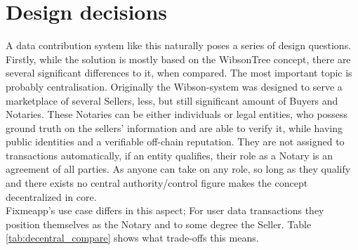\documentclass[a4paper,11pt]{report} %
\theoremstyle{change}
\theoremstyle{theoremstyle}
\begin{document}
\section{Design decisions}
A data contribution system like this naturally poses a series of design questions. Firstly, while the solution is mostly based on the WibsonTree concept, there are several significant differences to it, when compared. The most important topic is probably centralisation. Originally the Wibson-system was designed to serve a marketplace of several Sellers, less, but still significant amount of Buyers and Notaries. These Notaries can be either individuals or legal entities, who possess ground truth on the sellers' information and are able to verify it, while having public identities and a verifiable off-chain reputation. \cite{travizano2020wibson}
They are not assigned to transactions automatically, if an entity qualifies, their role as a Notary is an agreement of all parties.
As anyone can take on any role, so long as they qualify and there exists no central authority/control figure makes the concept decentralized in core.\\
Fixmeapp's use case differs in this aspect; For user data transactions they position themselves as the Notary and to some degree the Seller. Table \ref{tab:decentral_compare} shows what trade-offs this means.\\
\end{document}
